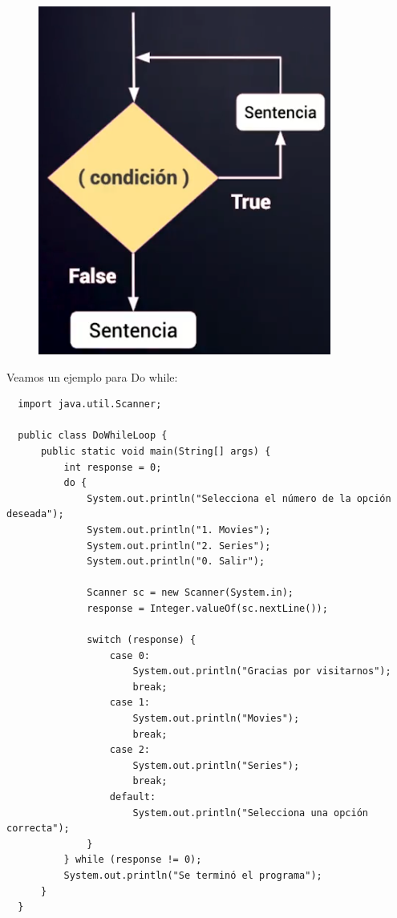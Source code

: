 \documentclass{article}
\begin{document}
\begin{figure}[h!]
  \centering
  \includegraphics[scale=0.75]{./Pictures/028_while.png}
\end{figure}

Veamos un ejemplo para Do while:

\begin{verbatim}
  import java.util.Scanner;

  public class DoWhileLoop {
      public static void main(String[] args) {
          int response = 0;
          do {
              System.out.println("Selecciona el número de la opción deseada");
              System.out.println("1. Movies");
              System.out.println("2. Series");
              System.out.println("0. Salir");

              Scanner sc = new Scanner(System.in);
              response = Integer.valueOf(sc.nextLine());

              switch (response) {
                  case 0:
                      System.out.println("Gracias por visitarnos");
                      break;
                  case 1:
                      System.out.println("Movies");
                      break;
                  case 2:
                      System.out.println("Series");
                      break;
                  default:
                      System.out.println("Selecciona una opción correcta");
              }
          } while (response != 0);
          System.out.println("Se terminó el programa");
      }
  }
\end{verbatim}
\end{document}
